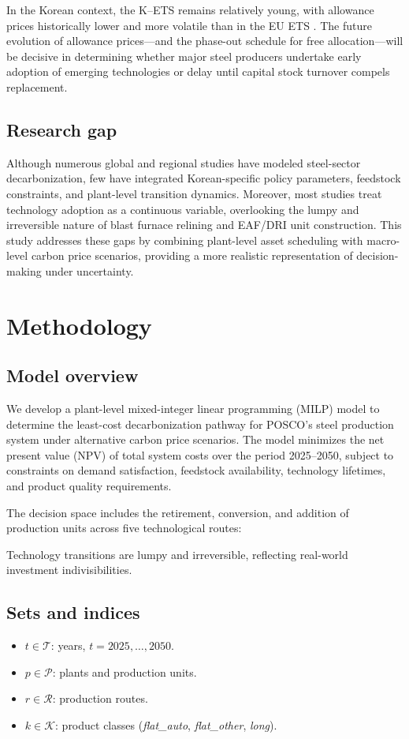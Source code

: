 \documentclass[preprint,5p,authoryear]{elsarticle}
\begin{document}
In the Korean context, the K--ETS remains relatively young, with allowance prices historically lower and more volatile than in the EU ETS \citep{kim2021kets}. The future evolution of allowance prices—and the phase-out schedule for free allocation—will be decisive in determining whether major steel producers undertake early adoption of emerging technologies or delay until capital stock turnover compels replacement.

\subsection{Research gap}
Although numerous global and regional studies have modeled steel-sector decarbonization, few have integrated Korean-specific policy parameters, feedstock constraints, and plant-level transition dynamics. Moreover, most studies treat technology adoption as a continuous variable, overlooking the lumpy and irreversible nature of blast furnace relining and EAF/DRI unit construction. This study addresses these gaps by combining plant-level asset scheduling with macro-level carbon price scenarios, providing a more realistic representation of decision-making under uncertainty.

\section{Methodology}

\subsection{Model overview}
We develop a plant-level mixed-integer linear programming (MILP) model to determine the least-cost decarbonization pathway for POSCO's steel production system under alternative carbon price scenarios. The model minimizes the net present value (NPV) of total system costs over the period 2025–2050, subject to constraints on demand satisfaction, feedstock availability, technology lifetimes, and product quality requirements. 

The decision space includes the retirement, conversion, and addition of production units across five technological routes: 

Technology transitions are lumpy and irreversible, reflecting real-world investment indivisibilities.

\subsection{Sets and indices}
\begin{itemize}[leftmargin=*]
    \item $t \in \mathcal{T}$: years, $t = 2025, \dots, 2050$.
    \item $p \in \mathcal{P}$: plants and production units.
    \item $r \in \mathcal{R}$: production routes.
    \item $k \in \mathcal{K}$: product classes (\emph{flat\_auto}, \emph{flat\_other}, \emph{long}).
\end{itemize}
\end{document}
